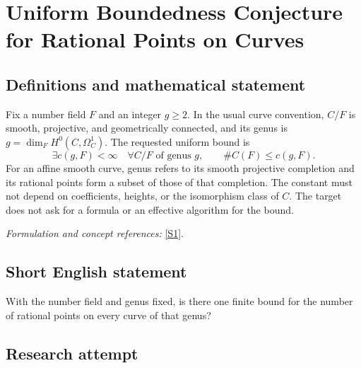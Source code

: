 \documentclass[11pt,a4paper]{article}
\newcommand{\sref}[2]{\hyperlink{source:#1:#2}{[S#2]}}
\newif\ifshowcatalogue
\newcommand{\cataloguescope}[1]{\ifshowcatalogue
 \paragraph{Exact scope in the supplied catalogue.}
 \begin{quote}\small #1\end{quote}\fi}
\numberwithin{equation}{section}
\begin{document}
\setcounter{section}{163}
\clearpage
\section{\texorpdfstring{Uniform Boundedness Conjecture for Rational Points on Curves}{Uniform Boundedness Conjecture for Rational Points on Curves}}\label{164}
\subsection{Definitions and mathematical statement}
Fix a number field $F$ and an integer $g\ge2$. In the usual curve convention, $C/F$ is smooth, projective, and geometrically connected, and its genus is $g=\dim_F H^0(C,\Omega_C^1)$. The requested uniform bound is
\[
 \exists c(g,F)<\infty\quad\forall C/F\text{ of genus }g,
 \qquad\#C(F)\le c(g,F).
\]
For an affine smooth curve, genus refers to its smooth projective completion and its rational points form a subset of those of that completion. The constant must not depend on coefficients, heights, or the isomorphism class of $C$. The target does not ask for a formula or an effective algorithm for the bound.
\par\smallskip\textit{Formulation and concept references:} \sref{164}{1}.
\cataloguescope{For each integer g >= 2 and number field F, prove that there is a constant c(g,F) such that every smooth curve C of genus g over F has at most c(g,F) F-rational points.}
\subsection{Short English statement}
With the number field and genus fixed, is there one finite bound for the number of rational points on every curve of that genus?
\subsection{Research attempt}
\end{document}
